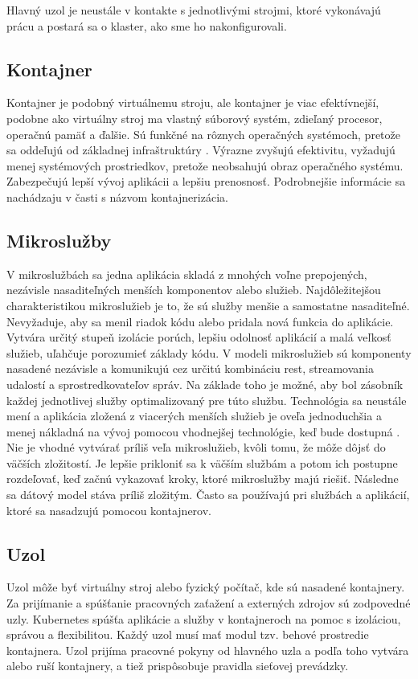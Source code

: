 Hlavný uzol je neustále v kontakte s jednotlivými strojmi, ktoré vykonávajú prácu a postará sa o klaster, ako sme ho nakonfigurovali.

\subsection*{Kontajner}
Kontajner je podobný virtuálnemu stroju, ale kontajner je viac efektívnejší, podobne ako virtuálny stroj ma vlastný súborový systém, zdieľaný procesor, operačnú pamäť a ďalšie. Sú funkčné na rôznych operačných systémoch, pretože sa oddeľujú od základnej infraštruktúry \cite{kubernetes}.
Výrazne zvyšujú efektivitu, vyžadujú menej systémových prostriedkov, pretože neobsahujú obraz operačného systému. Zabezpečujú lepší vývoj aplikácii a lepšiu prenosnosť. Podrobnejšie informácie sa nachádzaju v časti s názvom kontajnerizácia.

\subsection*{Mikroslužby}
V mikroslužbách sa jedna aplikácia skladá z mnohých voľne prepojených, nezávisle nasaditeľných menších komponentov alebo služieb. Najdôležitejšou charakteristikou mikroslužieb je to, že sú služby menšie a samostatne nasaditeľné. Nevyžaduje, aby sa menil riadok kódu alebo pridala nová funkcia do aplikácie. Vytvára určitý stupeň izolácie porúch, lepšiu odolnosť aplikácií a malá veľkosť služieb, uľahčuje porozumieť základy kódu. V modeli mikroslužieb sú komponenty nasadené nezávisle a komunikujú cez určitú kombináciu \acrshort{rest}, streamovania udalostí a sprostredkovateľov správ. Na základe toho je možné, aby bol zásobník každej jednotlivej služby optimalizovaný pre túto službu. Technológia sa neustále mení a aplikácia zložená z viacerých menších služieb je oveľa jednoduchšia a menej nákladná na vývoj pomocou vhodnejšej technológie, keď bude dostupná \cite{microibm}. Nie je vhodné vytvárať príliš veľa mikroslužieb, kvôli tomu, že môže dôjsť do väčších zložitostí. Je lepšie prikloniť sa k väčším službám a potom ich postupne rozdeľovať, keď začnú vykazovať kroky, ktoré mikroslužby majú riešiť. Následne sa dátový model stáva príliš zložitým. Často sa používajú pri službách a aplikácií, ktoré sa nasadzujú pomocou kontajnerov.

\subsection*{Uzol}
Uzol môže byť virtuálny stroj alebo fyzický počítač, kde sú nasadené kontajnery. Za prijímanie a spúšťanie pracovných zaťažení a externých zdrojov sú zodpovedné uzly. Kubernetes spúšťa aplikácie a služby v kontajneroch na pomoc s izoláciou, správou a flexibilitou. Každý uzol musí mať modul tzv. behové prostredie kontajnera. Uzol prijíma pracovné pokyny od hlavného uzla a podľa toho vytvára alebo ruší kontajnery, a tiež prispôsobuje pravidla sieťovej prevádzky.

